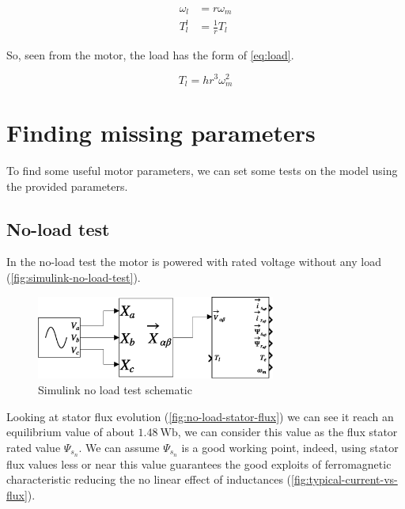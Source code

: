 \begin{align}
	\omega_l &= r \omega_m \nonumber \\
	T^l_l &= \frac{1}{r} T_l
	\label{eq:ideal-gear-box}
\end{align}

So, seen from the motor, the load has the form of \autoref{eq:load}.

\begin{equation}
	T_l = h r^3 \omega_m^2
	\label{eq:load}
\end{equation}

\section{Finding missing parameters}

To find some useful motor parameters, we can set some tests on the model using the provided parameters.

\subsection{No-load test}

In the no-load test the motor is powered with rated voltage without any load (\autoref{fig:simulink-no-load-test}).

\begin{figure}[htb]
	\centering
	\includegraphics[width=0.7\textwidth]{schematics/no_load_test}
	\caption{Simulink no load test schematic}
	\label{fig:simulink-no-load-test}
\end{figure}

Looking at stator flux evolution (\autoref{fig:no-load-stator-flux}) we can see it reach an equilibrium value of about $\qty{1.48}{\weber}$, we can consider this value as the flux stator rated value $\Psi_{s_n}$.
We can assume $\Psi_{s_n}$ is a good working point, indeed, using stator flux values less or near this value guarantees the good exploits of ferromagnetic characteristic reducing the no linear effect of inductances (\autoref{fig:typical-current-vs-flux}).

